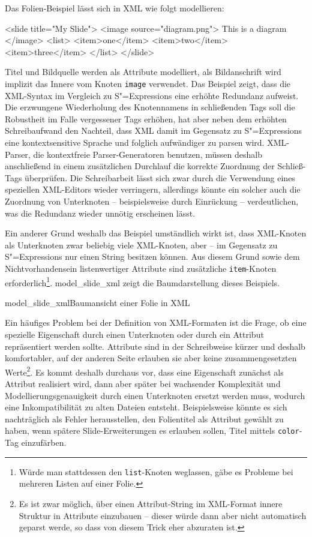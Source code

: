 \documentclass[12pt, a4paper, bibgerm]{scrbook}
\newenvironment{DIFnomarkup}{}{}
\newcommand\icode[1]{\lstinline?#1?}
\newcommand\abb{}
\newcommand\fig{}
\newcommand{\sexps}{S"=Expressions}
\begin{document}
Das Folien-Beispiel lässt sich in XML wie folgt modellieren:
\begin{DIFnomarkup}\begin{code}
<slide title="My Slide">
  <image source="diagram.png">
    This is a diagram
  </image>
  <list>
    <item>one</item>
    <item>two</item>
    <item>three</item>
  </list>
</slide>
\end{code}\end{DIFnomarkup} %
Titel und Bildquelle werden als Attribute modelliert, als
Bildanschrift wird implizit das Innere vom Knoten \icode{image}
verwendet. Das Beispiel zeigt, dass die XML-Syntax im Vergleich zu
\sexps{} eine erhöhte Redundanz aufweist. Die erzwungene Wiederholung
des Knotennamens in schließenden Tags soll die Robustheit im Falle
vergessener Tags erhöhen, hat aber neben dem erhöhten Schreibaufwand den
Nachteil, dass XML damit im Gegensatz zu \sexps{} eine kontextsensitive
Sprache und folglich aufwändiger zu parsen wird. XML-Parser, die
kontextfreie Parser-Generatoren benutzen, müssen deshalb anschließend in
einem zusätzlichen Durchlauf die korrekte Zuordnung der Schließ-Tags
überprüfen. Die Schreibarbeit lässt sich zwar durch die Verwendung eines
speziellen XML-Editors wieder verringern, allerdings könnte ein solcher
auch die Zuordnung von Unterknoten -- beispielsweise durch Einrückung -- 
verdeutlichen, was die Redundanz wieder unnötig erscheinen lässt.

Ein anderer Grund weshalb das Beispiel umständlich wirkt ist, dass
XML-Knoten als Unterknoten zwar beliebig viele XML-Knoten, aber -- im
Gegensatz zu \sexps{} nur einen String besitzen können. Aus diesem Grund
sowie dem Nichtvorhandensein listenwertiger Attribute sind zusätzliche
\icode{item}-Knoten erforderlich\footnote{Würde man stattdessen den
\icode{list}-Knoten weglassen, gäbe es Probleme bei mehreren Listen auf
einer Folie.}. \abb{model_slide_xml} zeigt die Baumdarstellung dieses
Beispiels.

\fig{model_slide_xml}{Baumansicht einer Folie in XML}

Ein häufiges Problem bei der Definition von XML-Formaten ist die Frage,
ob eine spezielle Eigenschaft durch einen Unterknoten oder durch ein
Attribut repräsentiert werden sollte. Attribute sind in der Schreibweise
kürzer und deshalb komfortabler, auf der anderen Seite erlauben sie aber
keine zusammengesetzten Werte\footnote{Es ist zwar möglich, über einen
  Attribut-String im XML-Format innere Struktur in Attribute einzubauen
  -- dieser würde dann aber nicht automatisch geparst werde, so dass von
  diesem Trick eher abzuraten ist.}. Es kommt deshalb durchaus vor, dass
eine Eigenschaft zunächst als Attribut realisiert wird, dann aber später
bei wachsender Komplexität und Modellierungsgenauigkeit durch einen
Unterknoten ersetzt werden muss, wodurch eine Inkompatibilität zu alten
Dateien entsteht. Beispielsweise könnte es sich nachträglich als Fehler
herausstellen, den Folientitel als Attribut gewählt zu haben, wenn
spätere Slide-Erweiterungen es erlauben sollen, Titel mittels
\icode{color}-Tag einzufärben.
\end{document}

